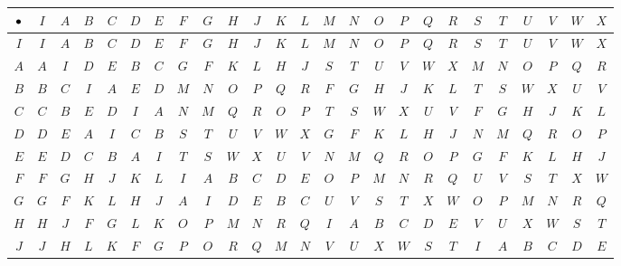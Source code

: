 \documentclass[../gatm_answers.tex]{subfiles}
\begin{document}
\begin{figure}[h]
	\begin{center}
		\begin{minipage}[b]{\textwidth}
			\centering
			\setlength{\tabcolsep}{2pt}
			\begin{tabular}{c|acccacccacccacccacccaccc}
				\hline
				$\bullet$ & $I$ & $A$ & $B$ & $C$ & $D$ & $E$ & $F$ & $G$ & $H$ & $J$ & $K$ & $L$ & $M$ & $N$ & $O$ & $P$ & $Q$ & $R$ & $S$ & $T$ & $U$ & $V$ & $W$ & $X$ \\ \hline
				$I$ & $I$ & $A$ & $B$ & $C$ & $D$ & $E$ & $F$ & $G$ & $H$ & $J$ & $K$ & $L$ & $M$ & $N$ & $O$ & $P$ & $Q$ & $R$ & $S$ & $T$ & $U$ & $V$ & $W$ & $X$ \\
				$A$ & $A$ & $I$ & $D$ & $E$ & $B$ & $C$ & $G$ & $F$ & $K$ & $L$ & $H$ & $J$ & $S$ & $T$ & $U$ & $V$ & $W$ & $X$ & $M$ & $N$ & $O$ & $P$ & $Q$ & $R$ \\
				$B$ & $B$ & $C$ & $I$ & $A$ & $E$ & $D$ & $M$ & $N$ & $O$ & $P$ & $Q$ & $R$ & $F$ & $G$ & $H$ & $J$ & $K$ & $L$ & $T$ & $S$ & $W$ & $X$ & $U$ & $V$ \\
				$C$ & $C$ & $B$ & $E$ & $D$ & $I$ & $A$ & $N$ & $M$ & $Q$ & $R$ & $O$ & $P$ & $T$ & $S$ & $W$ & $X$ & $U$ & $V$ & $F$ & $G$ & $H$ & $J$ & $K$ & $L$ \\
				$D$ & $D$ & $E$ & $A$ & $I$ & $C$ & $B$ & $S$ & $T$ & $U$ & $V$ & $W$ & $X$ & $G$ & $F$ & $K$ & $L$ & $H$ & $J$ & $N$ & $M$ & $Q$ & $R$ & $O$ & $P$ \\
				$E$ & $E$ & $D$ & $C$ & $B$ & $A$ & $I$ & $T$ & $S$ & $W$ & $X$ & $U$ & $V$ & $N$ & $M$ & $Q$ & $R$ & $O$ & $P$ & $G$ & $F$ & $K$ & $L$ & $H$ & $J$ \\
				$F$ & $F$ & $G$ & $H$ & $J$ & $K$ & $L$ & $I$ & $A$ & $B$ & $C$ & $D$ & $E$ & $O$ & $P$ & $M$ & $N$ & $R$ & $Q$ & $U$ & $V$ & $S$ & $T$ & $X$ & $W$ \\
				$G$ & $G$ & $F$ & $K$ & $L$ & $H$ & $J$ & $A$ & $I$ & $D$ & $E$ & $B$ & $C$ & $U$ & $V$ & $S$ & $T$ & $X$ & $W$ & $O$ & $P$ & $M$ & $N$ & $R$ & $Q$ \\
				$H$ & $H$ & $J$ & $F$ & $G$ & $L$ & $K$ & $O$ & $P$ & $M$ & $N$ & $R$ & $Q$ & $I$ & $A$ & $B$ & $C$ & $D$ & $E$ & $V$ & $U$ & $X$ & $W$ & $S$ & $T$ \\
				$J$ & $J$ & $H$ & $L$ & $K$ & $F$ & $G$ & $P$ & $O$ & $R$ & $Q$ & $M$ & $N$ & $V$ & $U$ & $X$ & $W$ & $S$ & $T$ & $I$ & $A$ & $B$ & $C$ & $D$ & $E$ \\

\end{tabular}
\end{minipage}
\end{center}
\end{figure}
\end{document}
